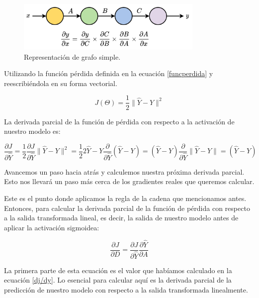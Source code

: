 \documentclass[a4paper,12pt]{article}
\begin{document}
\begin{figure}[H]
	\begin{center}				
		\includegraphics[width=0.8\textwidth]{025.png}
		\caption{Representación de grafo simple.}
		\label{fig:func}
	\end{center}
\end{figure}

Utilizando la función pérdida definida en la ecuación \ref{funcperdida} y reescribiéndola en su forma vectorial.

\begin{equation}
	J(\Theta)=\frac{1}{2} \|\hat{Y}-Y\|^2
\end{equation}

La derivada parcial de la función de pérdida con respecto a la activación de nuestro modelo es:

\begin{equation}
	\frac{\partial J}{\partial \hat{Y}}
	=\frac{1}{2} \frac{\partial J}{\partial \hat{Y}} \|\hat{Y}-Y\|^2 = \frac{1}{2} 2 \hat{Y} - Y \frac{\partial}{\partial \hat{Y}} (\hat{Y}-Y) = (\hat{Y}-Y) \frac{\partial}{\partial \hat{Y}} \|\hat{Y}-Y\| = (\hat{Y} - Y)
	\label{dj/dy}
\end{equation}

Avancemos un paso hacia atrás y calculemos nuestra próxima derivada parcial. Esto nos llevará un paso más cerca de los gradientes reales que queremos calcular.

Este es el punto donde aplicamos la regla de la cadena que mencionamos antes. Entonces, para calcular la derivada parcial de la función de pérdida con respecto a la salida transformada lineal, es decir, la salida de nuestro modelo antes de aplicar la activación sigmoidea:

\begin{equation}
	\frac{\partial J}{\partial D} = \frac{\partial J}{\partial \hat{Y}} \frac{\partial \hat{Y}}{\partial A}
	\label{dJdD}
\end{equation}

La primera parte de esta ecuación es el valor que habíamos calculado en la ecuación \ref{dj/dy}. Lo esencial para calcular aquí es la derivada parcial de la predicción de nuestro modelo con respecto a la salida transformada linealmente.
\end{document}
